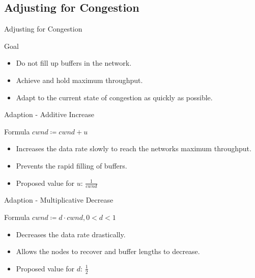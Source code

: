 \documentclass[english,aspectratio=43,t]{beamer}
\begin{document}
\subsection*{Adjusting for Congestion}
\label{sec:ac}
\begin{frame}{Adjusting for Congestion}
~\\
\begin{block}{Goal}
\begin{itemize}
\item Do not fill up buffers in the network.
\item Achieve and hold maximum throughput.
\item Adapt to the current state of congestion as quickly as possible.
\end{itemize}
\end{block}
\end{frame}

\begin{frame}{Adaption - Additive Increase}
~\\
\begin{block}{Formula}
$cwnd \coloneqq cwnd + u$
\end{block}
\begin{itemize}
\item Increases the data rate slowly to reach the networks maximum throughput.
\item Prevents the rapid filling of buffers.
\item Proposed value for $u$: $\frac{1}{cwnd}$
\end{itemize}
\end{frame}

\begin{frame}{Adaption - Multiplicative Decrease}
~\\
\begin{block}{Formula}
$cwnd \coloneqq d \cdot cwnd, 0<d<1$
\end{block}
\begin{itemize}
\item Decreases the data rate drastically.
\item Allows the nodes to recover and buffer lengths to decrease.
\item Proposed value for $d$: $\frac{1}{2}$
\end{itemize}
\end{frame}
\end{document}
